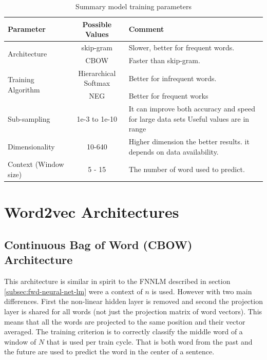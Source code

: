 \begin{table}[h]
   \centering
   \caption{Summary model training parameters} 
   \label{tab:word2_vec_parameters}
   
   \small
   \begin{tabular}{ |l|c|p{5cm}| }
   \hline           
    Parameter &  Possible Values & Comment \\  \hline           
    \multirow{2}{*}{Architecture}  & skip-gram  & Slower, better for frequent
    words. \\ 
    \cline{2-3}
    & \ac{CBOW}  &  Faster than skip-gram. \\ \hline
    \multirow{2}{*}{Training Algorithm}  & Hierarchical Softmax  & Better for infrequent words.   \\ 
    \cline{2-3}
    & \ac{NEG} & Better for frequent works \\ \hline
    Sub-sampling  & 1e-3 to 1e-10  &  It  can improve both accuracy and speed for large data
    sets Useful values are in range \\ \hline
    Dimensionality  & 10-640 & Higher dimension the better results. 
    it depends on data availability.  \\ \hline
    Context (Window size)  & 5 - 15 & The number of word used to predict. \\ \hline

    
\end{tabular}
\end{table}


\section{Word2vec Architectures}
\label{sec:word2v-architectures}


\subsection{Continuous Bag of Word (CBOW) Architecture}

This architecture is similar in spirit to the  \ac{FNNLM} described in section
\ref{subsec:fwd-neural-net-lm} were a context of $n$ is used. However with two main differences. First the
non-linear hidden layer is removed and second the projection layer is shared for
all words (not just the projection matrix of word vectors). This means that
all the words are projected to the same position and their vector averaged.
The training criterion is to correctly classify the middle word of a window
of $N$ that is used per train cycle. That is both word from the past and the
future are used to predict the word in the center of a sentence. 



